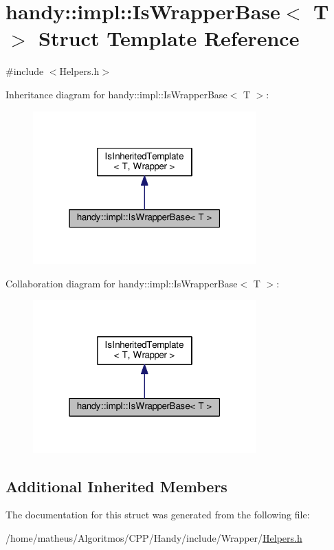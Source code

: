 \hypertarget{structhandy_1_1impl_1_1IsWrapperBase}{}\section{handy\+:\+:impl\+:\+:Is\+Wrapper\+Base$<$ T $>$ Struct Template Reference}
\label{structhandy_1_1impl_1_1IsWrapperBase}


{\ttfamily \#include $<$Helpers.\+h$>$}



Inheritance diagram for handy\+:\+:impl\+:\+:Is\+Wrapper\+Base$<$ T $>$\+:\nopagebreak
\begin{figure}[H]
\begin{center}
\leavevmode
\includegraphics[width=244pt]{structhandy_1_1impl_1_1IsWrapperBase__inherit__graph}
\end{center}
\end{figure}


Collaboration diagram for handy\+:\+:impl\+:\+:Is\+Wrapper\+Base$<$ T $>$\+:\nopagebreak
\begin{figure}[H]
\begin{center}
\leavevmode
\includegraphics[width=244pt]{structhandy_1_1impl_1_1IsWrapperBase__coll__graph}
\end{center}
\end{figure}
\subsection*{Additional Inherited Members}


The documentation for this struct was generated from the following file\+:\begin{DoxyCompactItemize}
\item 
/home/matheus/\+Algoritmos/\+C\+P\+P/\+Handy/include/\+Wrapper/\hyperlink{Wrapper_2Helpers_8h}{Helpers.\+h}\end{DoxyCompactItemize}
